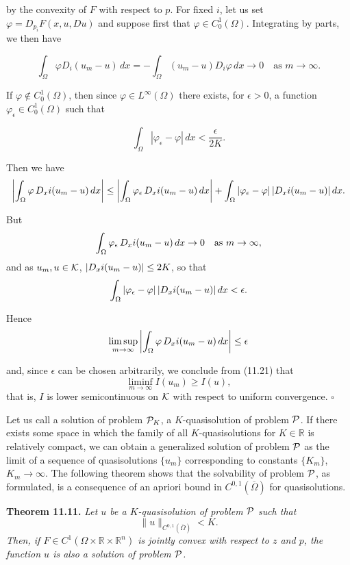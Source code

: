 by the convexity of $F$ with respect to $p$. For fixed $i$, let us set $\varphi=D_{p_i}F(x,u,Du)$ and suppose first that $\varphi\in C^1_0(\Omega)$. Integrating by parts, we then have

\[
\int_{\Omega}\varphi D_i(u_m-u)\,dx=-\int_{\Omega}(u_m-u)D_i\varphi\,dx\to 0\quad \text{as }m\to\infty.
\]

If $\varphi\notin C^1_0(\Omega)$, then since $\varphi\in L^\infty(\Omega)$ there exists, for $\epsilon>0$, a function $\varphi_\epsilon\in C^1_0(\Omega)$ such that

\[
\int_{\Omega}|\varphi_\epsilon-\varphi|\,dx<\frac{\epsilon}{2K}.
\]



Then we have
\[
\left|\int_{\Omega} \varphi\, D_x{i}(u_m-u)\,dx\right|
\le
\left|\int_{\Omega} \varphi_{\epsilon}\,D_x{i}(u_m-u)\,dx\right|
+ \int_{\Omega} |\varphi_{\epsilon}-\varphi|\,|D_x{i}(u_m-u)|\,dx.
\]

But
\[
\int_{\Omega} \varphi_{\epsilon}\,D_x{i}(u_m-u)\,dx \to 0
\quad \text{as } m \to \infty,
\]
and as $u_m, u \in \mathcal{K}$, $|D_x{i}(u_m-u)|\le 2K$, so that
\[
\int_{\Omega} |\varphi_{\epsilon}-\varphi|\,|D_x{i}(u_m-u)|\,dx < \epsilon.
\]

Hence
\[
\limsup_{m\to\infty}\left|\int_{\Omega} \varphi\,D_x{i}(u_m-u)\,dx\right|\le \epsilon
\]

and, since $\epsilon$ can be chosen arbitrarily, we conclude from (11.21) that
\[
\liminf_{m\to\infty} I(u_m)\ge I(u),
\]
that is, $I$ is lower semicontinuous on $\mathcal{K}$ with respect to uniform convergence.
\hfill $\square$

Let us call a solution of problem $\mathcal{P}_K$, a $K$-quasisolution of problem $\mathcal{P}$.
If there exists some space in which the family of all $K$-quasisolutions for
$K\in\mathbb{R}$ is relatively compact, we can obtain a generalized solution of
problem $\mathcal{P}$ as the limit of a sequence of quasisolutions $\{u_m\}$ corresponding
to constants $\{K_m\}$, $K_m\to\infty$. The following theorem shows that the
solvability of problem $\mathcal{P}$, as formulated, is a consequence of an apriori
bound in $C^{0,1}(\overline{\Omega})$ for quasisolutions.

\textbf{Theorem 11.11.} \emph{Let $u$ be a $K$-quasisolution of problem $\mathcal{P}$ such that}
\begin{equation}
\|u\|_{C^{0,1}(\overline{\Omega})} < K.
\tag{11.22}
\end{equation}
\emph{Then, if $F \in C^{1}(\Omega\times\mathbb{R}\times\mathbb{R}^n)$ is jointly convex with respect to $z$ and $p$, the function $u$ is also a solution of problem $\mathcal{P}$.}

